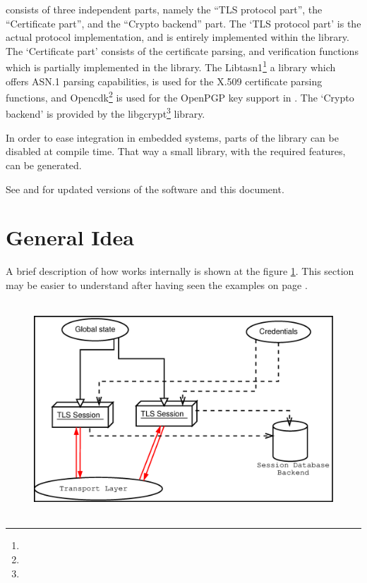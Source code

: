 \par 
\gnutls{} consists of three
independent parts, namely the ``TLS protocol part'', the ``Certificate part'', and 
the ``Crypto backend'' part.
The `TLS protocol part' is the actual protocol implementation, and is entirely
implemented within the \gnutls{} library.
The `Certificate part' consists of the certificate parsing, and verification
functions which is partially implemented in the \gnutls{} library. The
Libtasn1\footnote{}
a library which offers ASN.1 parsing capabilities, is used for the
X.509 certificate parsing functions, and
Opencdk\footnote{}
is used for the OpenPGP key support in \gnutls{}.
The `Crypto backend' is provided by the 
libgcrypt\footnote{}
library.
\par
In order to ease integration in embedded systems, parts of the \gnutls{} library 
can be disabled at compile time. That way a small library, with the required features,
can be generated.

\par
See 
and  
for updated versions of the \gnutls{} software and this document.

\section{General Idea}
A brief description of how \gnutls{} works internally is shown at
the figure \ref{fig:internals}. This section may be easier to understand
after having seen the examples on page \pageref{examples}.

\begin{figure}[htp]
\includegraphics[height=8cm,width=12cm]{internals}
\label{fig:internals}
\end{figure}

